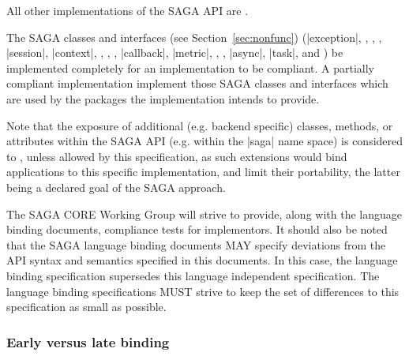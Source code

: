   All other implementations of the SAGA API are .

  The SAGA \LF classes and interfaces (see
  Section~\ref{sec:nonfunc}) (|exception|,
  , , ,
  |session|, |context|, , ,
  , |callback|, |metric|, ,
  , |async|, |task|, and )
   be implemented completely for an
  implementation to be compliant.  A partially compliant
  implementation  implement those SAGA
  \LF classes and interfaces which are used by the
  packages the implementation intends to provide.  
  
  

  Note that the exposure of additional (e.g. backend specific)
  classes, methods, or attributes within the SAGA API (e.g.
  within the |saga| name space) is considered to , unless  allowed by this
  specification, as such extensions would bind applications to
  this specific implementation, and limit their portability,
  the latter being a declared goal of the SAGA approach.

  The SAGA CORE Working Group will strive to provide, along with
  the language binding documents, compliance tests for
  implementors.  It should also be noted that the SAGA language
  binding documents MAY specify deviations from the API syntax
  and semantics specified in this documents.  In this case, the
  language binding specification supersedes this language
  independent specification.  The language binding
  specifications MUST  strive to keep the set
  of differences to this specification as small as possible.


  \subsubsection{Early versus late binding}


